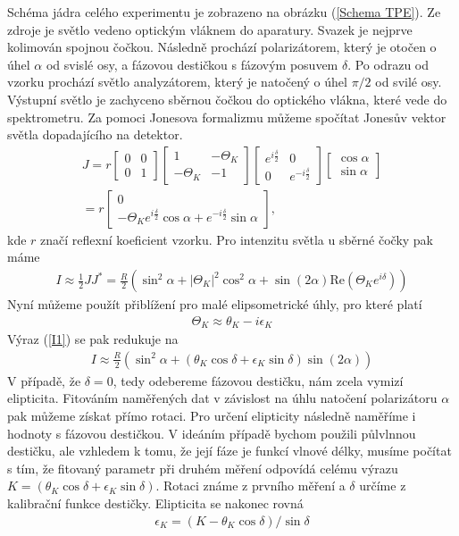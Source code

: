 Schéma jádra celého experimentu je zobrazeno na obrázku (\ref{Schema TPE}). Ze zdroje je světlo vedeno optickým vláknem do aparatury. Svazek je nejprve kolimován spojnou čočkou. Následně prochází polarizátorem, který je otočen o úhel $\alpha$ od svislé osy, a fázovou destičkou s fázovým posuvem $\delta$. Po odrazu od vzorku prochází světlo analyzátorem, který je natočený o úhel $\pi/2$ od svilé osy. Výstupní světlo je zachyceno sběrnou čočkou do optického vlákna, které vede do spektrometru. Za pomoci Jonesova formalizmu můžeme spočítat Jonesův vektor světla dopadajícího na detektor.
\begin{eqnarray}
J=r\begin{bmatrix}0&0\\0&1\end{bmatrix}\begin{bmatrix}1&-\Theta_K\\-\Theta_K&-1\end{bmatrix}\begin{bmatrix}e^{i\frac{\delta}{2}}&0\\0&e^{-i\frac{\delta}{2}}\end{bmatrix}\begin{bmatrix}\cos\alpha\\\sin\alpha\end{bmatrix}\\
=r\begin{bmatrix}0\\-\Theta_Ke^{i\frac{\delta}{2}}\cos\alpha+e^{-i\frac{\delta}{2}}\sin\alpha\end{bmatrix},
\end{eqnarray}
kde $r$ značí reflexní koeficient vzorku. Pro intenzitu světla u sběrné čočky pak máme
\begin{eqnarray}
I\approx\frac{1}{2}JJ^*=\frac{R}{2}(\sin^2\alpha+|\Theta_K|^2\cos^2\alpha+\sin(2\alpha)\mbox{Re}(\Theta_Ke^{i\delta}))
\label{I1}
\end{eqnarray}
Nyní můžeme použít přiblížení pro malé elipsometrické úhly, pro které platí
\begin{eqnarray}
\Theta_K\approx\theta_K-i\epsilon_K
\end{eqnarray}
Výraz (\ref{I1}) se pak redukuje na
\begin{eqnarray}
I\approx\frac{R}{2}(\sin^2\alpha+(\theta_K\cos\delta+\epsilon_K\sin\delta)\sin(2\alpha))
\label{I2}
\end{eqnarray}
V  případě, že $\delta=0$, tedy odebereme fázovou destičku, nám zcela vymizí elipticita. Fitováním naměřených dat v závislost na úhlu natočení polarizátoru $\alpha$ pak můžeme získat přímo rotaci. Pro určení elipticity následně naměříme i hodnoty s fázovou destičkou. V ideáním případě bychom použili půlvlnnou destičku, ale vzhledem k tomu, že její fáze je funkcí vlnové délky, musíme počítat s tím, že fitovaný parametr při druhém měření odpovídá celému výrazu $K=(\theta_K\cos\delta+\epsilon_K\sin\delta)$. Rotaci známe z prvního měření a $\delta$ určíme z kalibrační funkce destičky. Elipticita se nakonec rovná
\begin{eqnarray}
\epsilon_K=(K-\theta_K\cos\delta)/\sin\delta
\end{eqnarray}

